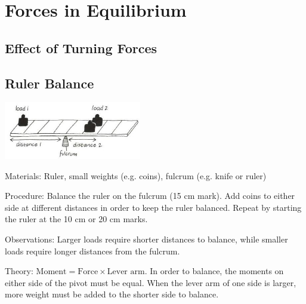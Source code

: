 \section{Forces in Equilibrium}  

\begin{multicols}{2}


\section*{Effect of Turning Forces}


\subsection{Ruler Balance}

\begin{center}
\includegraphics[width=0.45\textwidth]{./img/vso/lever-balance.jpg}
\end{center}

\begin{description*}
\item[Materials:]{Ruler, small weights (e.g. coins), fulcrum (e.g. knife or ruler)}
\item[Procedure:]{Balance the ruler on the fulcrum (15 cm mark). Add coins to either side at different distances in order to keep the ruler balanced. Repeat by starting the ruler at the 10 cm or 20 cm marks.}
\item[Observations:]{Larger loads require shorter distances to balance, while smaller loads require longer distances from the fulcrum.}
\item[Theory:]{$\text{Moment} = \text{Force} \times \text{Lever arm}$. In order to balance, the moments on either side of the pivot must be equal. When the lever arm of one side is larger, more weight must be added to the shorter side to balance.}
\end{description*}


\end{multicols}
